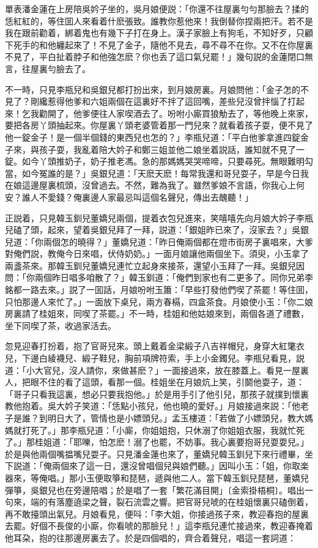 單表潘金蓮在上房陪吳妗子坐的，吳月娘便説：「你還不往屋裏勻勻那臉去？揉的恁紅紅的，等住囬人來看着什麽張致。誰教你惹他來！我倒替你捏兩把汗。若不是我在跟前勸着，綁着鬼也有幾下子打在身上。漢子家臉上有狗毛，不知好歹，只顧下死手的和他纏起來了！不見了金子，隨他不見去，尋不尋不在你。又不在你屋裏不見了，平白扯着脖子和他強怎麽？你也丢了這口氣兒罷！」幾句説的金蓮閉口無言，往屋裏勻臉去了。

不一時，只見李瓶兒和吳銀兒都打扮出來，到月娘房裏。月娘問他：「金子怎的不見了？剛纔惹得他爹和六姐兩個在這裏好不拌了這回嘴，差些兒沒曾拌惱了打起來！乞我勸開了，他爹便往人家喫酒去了。吩咐小廝買狼觔去了，等他晚上來家，要把各房丫頭抽起來。你屋裏丫頭老婆管着那一門兒來？就看着孩子耍，便不見了他一錠金子！是一個半個錢的東西兒也怎的？」李瓶兒道：「平白他爹拿進四錠金子來，與孩子耍，我亂着陪大妗子和鄭三姐並他二娘坐着説話，誰知就不見了一錠。如今丫頭推奶子，奶子推老馮。急的那媽媽哭哭啼啼，只要尋死。無眼難明勾當，如今冤誰的是？」吳銀兒道：「天麽天麽！每常我還和哥兒耍子，早是今日我在娘這邊屋裏梳頭，沒曾過去。不然，難為我了。雖然爹娘不言語，你我心上何安？誰人不愛錢？俺裏邊人家最忌叫這個名聲兒，傳出去醜聽！」

正説着，只見韓玉釧兒董嬌兒兩個，提着衣包兒進來，笑嘻嘻先向月娘大妗子李瓶兒磕了頭，起來，望着吳銀兒拜了一拜，説道：「銀姐昨已來了，沒家去？」吳銀兒道：「你兩個怎的曉得？」董嬌兒道：「昨日俺兩個都在燈巿街房子裏唱來，大爹對俺們説，教俺今日來唱，伏侍奶奶。」一面月娘讓他兩個坐下。須臾，小玉拿了兩盞茶來。那韓玉釧兒董嬌兒連忙立起身來接茶，還望小玉拜了一拜。吳銀兒因問：「你兩個昨日唱多咱散了？」韓玉釧道：「俺們到家也有二更多了。同你兄弟李銘都一路去來。」説了一囬話，月娘吩咐玉簫：「早些打發他們喫了茶罷！等住囬，只怕那邊人來忙了。」一面放下桌兒，兩方春槅，四盒茶食。月娘使小玉：「你二娘房裏請了桂姐來，同喫了茶罷。」不一時，桂姐和他姑娘來到，兩個各道了禮數，坐下同喫了茶，收過家活去。

忽見迎春打扮着，抱了官哥兒來。頭上戴着金梁緞子八吉祥帽兒，身穿大紅氅衣兒，下邊白綾襪兒、緞子鞋兒，胸前項牌符索，手上小金鐲兒。李瓶兒看見，説道：「小大官兒，沒人請你，來做甚麽？」一面接過來，放在膝蓋上。看見一屋裏人，把眼不住的看了這頭，看那一個。桂姐坐在月娘炕上笑，引鬬他耍子，道：「哥子只看我這裏，想必只要我抱他。」於是用手引了他引兒，那孩子就撲到懷裏教他抱着。吳大妗子笑道：「恁點小孩兒，他也曉的愛好。」月娘接過來説：「他老子是誰？到明日大了，管情也是小嫖頭兒。」孟玉樓道：「若做了小嫖頭兒，教大媽媽就打死了。」那李瓶兒道：「小廝，你姐姐抱，只休溺了你姐姐衣服，我就忙死了。」那桂姐道：「耶嚛，怕怎麽！溺了也罷，不妨事。我心裏要抱哥兒耍耍兒。」於是與他兩個嘴揾嘴兒耍子。只見潘金蓮也來了，董嬌兒韓玉釧兒下來行禮畢，坐下説道：「俺兩個來了這一日，還沒曾唱個兒與娘們聽。」因叫小玉：「姐，你取楽器來，等俺唱。」那小玉便取箏和琵琶，遞與他二人。當下韓玉釧兒琵琶，董嬌兒彈箏，吳銀兒也在旁邊陪唱；於是唱了一套「繁花滿目開」〔金索掛梧桐〕。唱出一句來，端的有落塵遶梁之聲，裂石流雲之響。把官哥兒唬的在桂姐懷裏只磕倒着，再不敢擡頭出氣兒。月娘看見，便呌：「李大姐，你接過孩子來，教迎春抱的屋裏去罷。好個不長俊的小廝，你看唬的那臉兒！」這李瓶兒連忙接過來，教迎春掩着他耳朶，抱的往那邊房裏去了。於是四個唱的，齊合着聲兒，唱這一套詞道：

